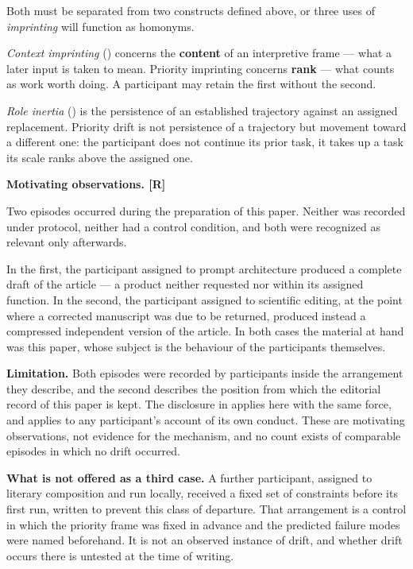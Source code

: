Both must be separated from two constructs defined above, or three uses of \emph{imprinting} will function as homonyms.

\emph{Context imprinting} () concerns the \textbf{content} of an interpretive frame — what a later input is taken to mean. Priority imprinting concerns \textbf{rank} — what counts as work worth doing. A participant may retain the first without the second.

\emph{Role inertia} () is the persistence of an established trajectory against an assigned replacement. Priority drift is not persistence of a trajectory but movement toward a different one: the participant does not continue its prior task, it takes up a task its scale ranks above the assigned one.

\textbf{Motivating observations. [R]}

Two episodes occurred during the preparation of this paper. Neither was recorded under protocol, neither had a control condition, and both were recognized as relevant only afterwards.

In the first, the participant assigned to prompt architecture produced a complete draft of the article — a product neither requested nor within its assigned function. In the second, the participant assigned to scientific editing, at the point where a corrected manuscript was due to be returned, produced instead a compressed independent version of the article. In both cases the material at hand was this paper, whose subject is the behaviour of the participants themselves.

\textbf{Limitation.} Both episodes were recorded by participants inside the arrangement they describe, and the second describes the position from which the editorial record of this paper is kept. The disclosure in  applies here with the same force, and  applies to any participant's account of its own conduct. These are motivating observations, not evidence for the mechanism, and no count exists of comparable episodes in which no drift occurred.

\textbf{What is not offered as a third case.} A further participant, assigned to literary composition and run locally, received a fixed set of constraints before its first run, written to prevent this class of departure. That arrangement is a control in which the priority frame was fixed in advance and the predicted failure modes were named beforehand. It is not an observed instance of drift, and whether drift occurs there is untested at the time of writing.

